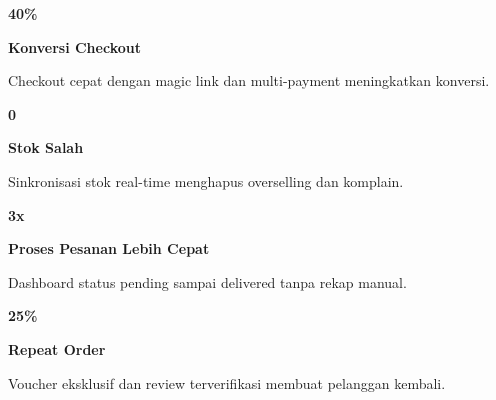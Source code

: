 \documentclass[a4paper]{article}
\begin{document}
\noindent
\begin{minipage}[t]{0.485\textwidth}
    \noindent\colorbox{BlueBg}{%
        \begin{minipage}[t][2.7cm][c]{\dimexpr\linewidth-2\fboxsep\relax}
            \centering
            {\fontsize{20}{24}\selectfont\bfseries\color{BluePrimary} 40\%}\par\vspace{2pt}
            {\fontsize{9.5}{12}\selectfont\bfseries\color{BlueDark} Konversi Checkout}\par\vspace{2pt}
            {\fontsize{8.5}{11}\selectfont\color{TextDark}Checkout cepat dengan magic link dan multi-payment meningkatkan konversi.}
        \end{minipage}}\par
    \vspace{6pt}
    \noindent\colorbox{BlueBg}{%
        \begin{minipage}[t][2.7cm][c]{\dimexpr\linewidth-2\fboxsep\relax}
            \centering
            {\fontsize{20}{24}\selectfont\bfseries\color{BluePrimary} 0}\par\vspace{2pt}
            {\fontsize{9.5}{12}\selectfont\bfseries\color{BlueDark} Stok Salah}\par\vspace{2pt}
            {\fontsize{8.5}{11}\selectfont\color{TextDark}Sinkronisasi stok real-time menghapus overselling dan komplain.}
        \end{minipage}}%
\end{minipage}%
\hfill
\begin{minipage}[t]{0.485\textwidth}
    \noindent\colorbox{BlueBg}{%
        \begin{minipage}[t][2.7cm][c]{\dimexpr\linewidth-2\fboxsep\relax}
            \centering
            {\fontsize{20}{24}\selectfont\bfseries\color{BluePrimary} 3x}\par\vspace{2pt}
            {\fontsize{9.5}{12}\selectfont\bfseries\color{BlueDark} Proses Pesanan Lebih Cepat}\par\vspace{2pt}
            {\fontsize{8.5}{11}\selectfont\color{TextDark}Dashboard status pending sampai delivered tanpa rekap manual.}
        \end{minipage}}\par
    \vspace{6pt}
    \noindent\colorbox{BlueBg}{%
        \begin{minipage}[t][2.7cm][c]{\dimexpr\linewidth-2\fboxsep\relax}
            \centering
            {\fontsize{20}{24}\selectfont\bfseries\color{BluePrimary} 25\%}\par\vspace{2pt}
            {\fontsize{9.5}{12}\selectfont\bfseries\color{BlueDark} Repeat Order}\par\vspace{2pt}
            {\fontsize{8.5}{11}\selectfont\color{TextDark}Voucher eksklusif dan review terverifikasi membuat pelanggan kembali.}
        \end{minipage}}%
\end{minipage}
\end{document}
